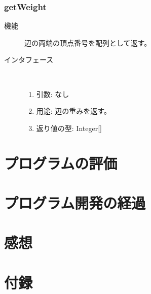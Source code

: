 \documentclass[a4j]{jarticle}
\begin{document}
\subsubsection{getWeight}

\begin{description}
\item[機能]
辺の両端の頂点番号を配列として返す。

\item[インタフェース]\ \vspace{0mm}
\begin{enumerate}
  \item 引数: なし
  \item 用途: 辺の重みを返す。
  \item 返り値の型: Integer[]
\end{enumerate}
\end{description}


\section{プログラムの評価}



\section{プログラム開発の経過}


\section{感想}


\newpage
\section*{付録}

\end{document}
